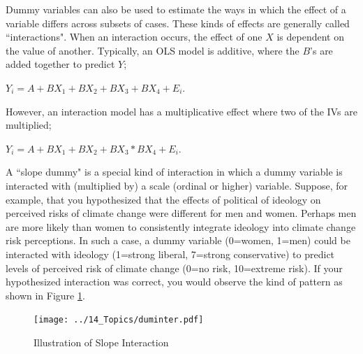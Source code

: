 \documentclass[11pt,openany]{book}
\begin{document}
Dummy variables can also be used to estimate the ways in which the effect of a variable differs across subsets of cases. These kinds of effects are generally called ``interactions".  When an interaction occurs, the effect of one $X$ is dependent on the value of another. Typically, an OLS model is additive, where the $B$'s are added together to predict $Y$; 

  $Y_i = A + BX_1 + BX_2 + BX_3 + BX_4 + E_i$. 
  
However, an interaction model has a multiplicative effect where two of the IVs are multiplied;

  $Y_i = A + BX_1 + BX_2 + BX_3 * BX_4 + E_i$. 

A ``slope dummy" is a special kind of interaction in which a dummy variable  is interacted with (multiplied by) a scale (ordinal or higher) variable. Suppose, for example, that you hypothesized that the effects of political of ideology on perceived risks of climate change were different for men and women. Perhaps men are more likely than women to consistently integrate ideology into climate change risk perceptions. In such a case, a dummy variable (0=women, 1=men) could be interacted with ideology (1=strong liberal, 7=strong conservative) to predict levels of perceived risk of climate change (0=no risk, 10=extreme risk).  If your hypothesized interaction was correct, you would observe the kind of pattern as shown in Figure \ref{fig:dumin}. 

\begin{figure}
  \centering
  \texttt{[image: ../14\_Topics/duminter.pdf]}
  \caption {Illustration of Slope Interaction \label{fig:dumin}}
\end{figure}
\end{document}
